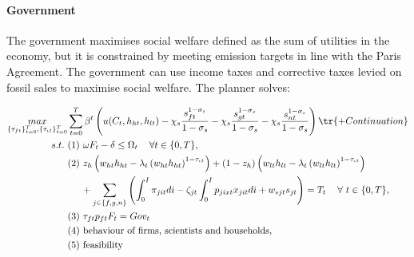 \paragraph{Government}

The government maximises social welfare defined as the sum of utilities in the economy, but it is constrained by meeting emission targets in line with the Paris Agreement. The government can use income taxes and corrective taxes levied on fossil sales to maximise social welfare. The planner solves:

\begin{align*}
\underset{\{\tau_{ft}\}_{t=0}^{T},\{\tau_{\iota t}\}_{t=0}^{T}}{max}&\sum_{t=0}^{T}\beta^t\left( u(C_{t}, h_{ht}, h_{lt})-\chi_s\frac{s_{ft}^{1-\sigma_s}}{{1-\sigma_s}}-\chi_s\frac{s_{gt}^{1-\sigma_s}}{{1-\sigma_s}}-\chi_s\frac{s_{nt}^{1-\sigma_s}}{{1-\sigma_s}}\right) \tr{+Continuation}\\
s.t.\ %
& (1)\ \omega F_{t} -\delta \leq \Omega_t \ \hspace{3mm} \forall t \in\{0,T\}, \\ %
& (2)\ z_h\left(w_{ht}h_{ht}-\lambda_t \left(w_{ht}h_{ht}\right)^{1-\tau_{\iota t}}\right)+(1-z_h)\left(w_{lt}h_{lt}-\lambda_t\left(w_{lt}h_{lt}\right)^{1-\tau_{\iota t}}\right) \\
& \hspace{5mm} +\sum_{j\in\{f,g,n\}}\left(\int_{0}^{I}\pi_{jit}di-\zeta_{jt}\int_{0}^{I}p_{jixt}x_{jit}di+w_{sjt}s_{jt}\right)= T_t \ \hspace{3mm} \forall \ t\in\{0,T\}, \\
& (3)\ \tau_{ft}p_{ft}F_{t} = Gov_t\\
& (4)\ \text{behaviour of firms, scientists and households},\\
& (5)\ \text{feasibility}
\end{align*}

